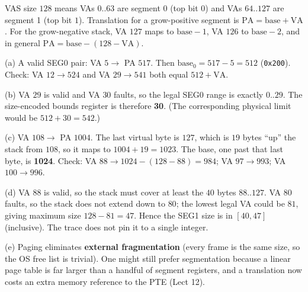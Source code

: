 \documentclass[11pt,a4paper]{article}
\newenvironment{Sol}{%
  \begin{tcolorbox}[sboxstyle, title={Solution}]%
}{%
  \end{tcolorbox}\vspace{0.35em}%
}
\begin{document}
\begin{Sol}
VAS size $128$ means VAs $0..63$ are segment 0 (top bit $0$) and
VAs $64..127$ are segment 1 (top bit $1$). Translation for a
grow-positive segment is $\mathrm{PA}=\mathrm{base}+\mathrm{VA}$. For the
grow-negative stack, VA $127$ maps to $\mathrm{base}-1$, VA $126$ to
$\mathrm{base}-2$, and in general
$\mathrm{PA}=\mathrm{base}-(128-\mathrm{VA})$.

(a) A valid SEG0 pair: VA $5\to$ PA $517$. Then
$\mathrm{base}_0=517-5=512$ (\texttt{0x200}). Check: VA $12\to 524$
and VA $29\to 541$ both equal $512+\mathrm{VA}$.

(b) VA $29$ is valid and VA $30$ faults, so the legal SEG0 range is
exactly $0..29$. The size-encoded bounds register is therefore
\textbf{30}. (The corresponding physical limit would be $512+30=542$.)

(c) VA $108\to$ PA $1004$. The last virtual byte is $127$, which is
$19$ bytes ``up'' the stack from $108$, so it maps to $1004+19=1023$.
The base, one past that last byte, is \textbf{1024}. Check:
VA $88\to 1024-(128-88)=984$; VA $97\to 993$; VA $100\to 996$.

(d) VA $88$ is valid, so the stack must cover at least the $40$ bytes
$88..127$. VA $80$ faults, so the stack does not extend down to $80$;
the lowest legal VA could be $81$, giving maximum size $128-81=47$.
Hence the SEG1 size is in \textbf{$[40,47]$} (inclusive). The
trace does not pin it to a single integer.

(e) Paging eliminates \textbf{external fragmentation} (every frame is
the same size, so the OS free list is trivial). One might still prefer
segmentation because a linear page table is far larger than a handful
of segment registers, and a translation now costs an extra memory
reference to the PTE (Lect 12).
\end{Sol}
\end{document}
